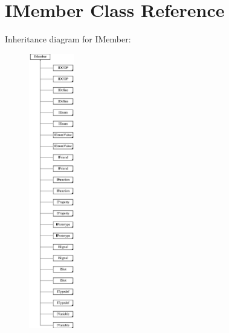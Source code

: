\hypertarget{class_i_member}{}\section{I\+Member Class Reference}
\label{class_i_member}
Inheritance diagram for I\+Member\+:\begin{figure}[H]
\begin{center}
\leavevmode
\includegraphics[height=12.000000cm]{class_i_member}
\end{center}
\end{figure}
